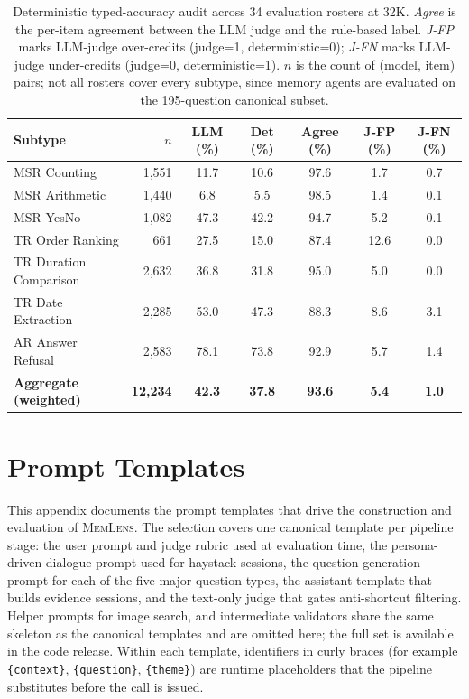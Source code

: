 \documentclass{article}
\newcommand{\bench}{\textsc{MemLens}}
\begin{document}
\begin{table}[h]
\centering
\small
\caption{Deterministic typed-accuracy audit across 34 evaluation rosters at 32K. \textit{Agree} is the per-item agreement between the LLM judge and the rule-based label. \textit{J-FP} marks LLM-judge over-credits (judge=1, deterministic=0); \textit{J-FN} marks LLM-judge under-credits (judge=0, deterministic=1). $n$ is the count of (model, item) pairs; not all rosters cover every subtype, since memory agents are evaluated on the 195-question canonical subset.}
\label{tab:det_audit}
\begin{tabular}{@{}lrccccc@{}}
\toprule
\textbf{Subtype} & \textbf{$n$} & \textbf{LLM (\%)} & \textbf{Det (\%)} & \textbf{Agree (\%)} & \textbf{J-FP (\%)} & \textbf{J-FN (\%)} \\
\midrule
MSR Counting & 1{,}551 & 11.7 & 10.6 & 97.6 & 1.7 & 0.7 \\
MSR Arithmetic & 1{,}440 & 6.8 & 5.5 & 98.5 & 1.4 & 0.1 \\
MSR YesNo & 1{,}082 & 47.3 & 42.2 & 94.7 & 5.2 & 0.1 \\
TR Order Ranking & 661 & 27.5 & 15.0 & 87.4 & 12.6 & 0.0 \\
TR Duration Comparison & 2{,}632 & 36.8 & 31.8 & 95.0 & 5.0 & 0.0 \\
TR Date Extraction & 2{,}285 & 53.0 & 47.3 & 88.3 & 8.6 & 3.1 \\
AR Answer Refusal & 2{,}583 & 78.1 & 73.8 & 92.9 & 5.7 & 1.4 \\
\midrule
\textbf{Aggregate (weighted)} & \textbf{12{,}234} & \textbf{42.3} & \textbf{37.8} & \textbf{93.6} & \textbf{5.4} & \textbf{1.0} \\
\bottomrule
\end{tabular}
\end{table}



\section{Prompt Templates}
\label{app:prompts}

This appendix documents the prompt templates that drive the construction and evaluation of \bench. The selection covers one canonical template per pipeline stage: the user prompt and judge rubric used at evaluation time, the persona-driven dialogue prompt used for haystack sessions, the question-generation prompt for each of the five major question types, the assistant template that builds evidence sessions, and the text-only judge that gates anti-shortcut filtering. Helper prompts for image search, and intermediate validators share the same skeleton as the canonical templates and are omitted here; the full set is available in the code release. Within each template, identifiers in curly braces (for example \texttt{\{context\}}, \texttt{\{question\}}, \texttt{\{theme\}}) are runtime placeholders that the pipeline substitutes before the call is issued.
\end{document}
